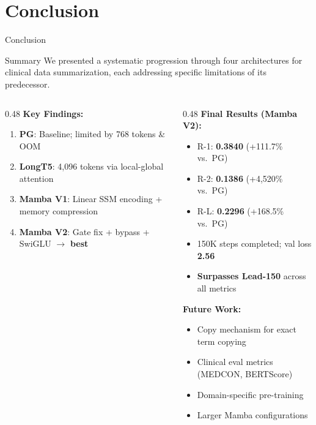 \documentclass[10pt, aspectratio=169]{beamer}
\begin{document}
\section{Conclusion}

\begin{frame}{Conclusion}
  \begin{block}{Summary}
    \small We presented a systematic progression through four architectures for clinical data summarization, each addressing specific limitations of its predecessor.
  \end{block}

  \vspace{0.1cm}
  \small
  \begin{columns}[T]
    \begin{column}{0.48\textwidth}
      \textbf{Key Findings:}
      \begin{enumerate}\setlength{\itemsep}{0pt}
        \item \textbf{PG}: Baseline; limited by 768 tokens \& OOM
        \item \textbf{LongT5}: 4,096 tokens via local-global attention
        \item \textbf{Mamba V1}: Linear SSM encoding + memory compression
        \item \textbf{Mamba V2}: Gate fix + bypass + SwiGLU $\rightarrow$ \textbf{best}
      \end{enumerate}
    \end{column}
    \begin{column}{0.48\textwidth}
      \textbf{Final Results (Mamba V2):}
      \begin{itemize}\setlength{\itemsep}{0pt}
        \item R-1: \textbf{0.3840} (+111.7\% vs.\ PG)
        \item R-2: \textbf{0.1386} (+4,520\% vs.\ PG)
        \item R-L: \textbf{0.2296} (+168.5\% vs.\ PG)
        \item 150K steps completed; val loss \textbf{2.56}
        \item \textbf{Surpasses Lead-150} across all metrics
      \end{itemize}

      \vspace{0.1cm}
      \textbf{Future Work:}
      \begin{itemize}\setlength{\itemsep}{0pt}
        \item Copy mechanism for exact term copying
        \item Clinical eval metrics (MEDCON, BERTScore)
        \item Domain-specific pre-training
        \item Larger Mamba configurations
      \end{itemize}
    \end{column}
  \end{columns}
\end{frame}
\end{document}
